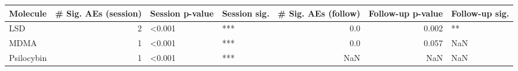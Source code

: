 \begin{tabular}{lrllrrl}
\toprule
  Molecule &  \# Sig. AEs (session) & Session p-value & Session sig. &  \# Sig. AEs (follow) &  Follow-up p-value & Follow-up sig. \\
\midrule
       LSD &                      2 &          <0.001 &          *** &                   0.0 &              0.002 &             ** \\
      MDMA &                      1 &          <0.001 &          *** &                   0.0 &              0.057 &            NaN \\
Psilocybin &                      1 &          <0.001 &          *** &                   NaN &                NaN &            NaN \\
\bottomrule
\end{tabular}
